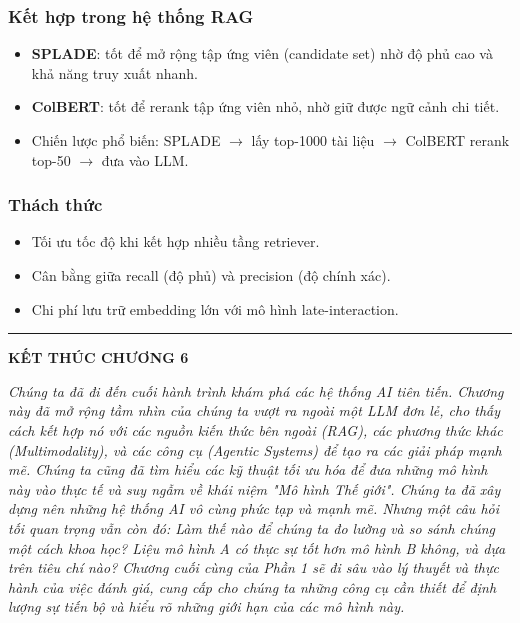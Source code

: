 \subsubsection*{Kết hợp trong hệ thống RAG}
\begin{itemize}
    \item \textbf{SPLADE}: tốt để mở rộng tập ứng viên (candidate set) nhờ độ phủ cao và khả năng truy xuất nhanh.
    \item \textbf{ColBERT}: tốt để rerank tập ứng viên nhỏ, nhờ giữ được ngữ cảnh chi tiết.
    \item Chiến lược phổ biến: SPLADE \(\rightarrow\) lấy top-1000 tài liệu \(\rightarrow\) ColBERT rerank top-50 \(\rightarrow\) đưa vào LLM.
\end{itemize}

\subsubsection*{Thách thức}
\begin{itemize}
    \item Tối ưu tốc độ khi kết hợp nhiều tầng retriever.
    \item Cân bằng giữa recall (độ phủ) và precision (độ chính xác).
    \item Chi phí lưu trữ embedding lớn với mô hình late-interaction.
\end{itemize}

\bigskip
\hrule
\bigskip

\begin{center}
    \textbf{\Large KẾT THÚC CHƯƠNG 6}
\end{center}

\textit{Chúng ta đã đi đến cuối hành trình khám phá các hệ thống AI tiên tiến. Chương này đã mở rộng tầm nhìn của chúng ta vượt ra ngoài một LLM đơn lẻ, cho thấy cách kết hợp nó với các nguồn kiến thức bên ngoài (RAG), các phương thức khác (Multimodality), và các công cụ (Agentic Systems) để tạo ra các giải pháp mạnh mẽ. Chúng ta cũng đã tìm hiểu các kỹ thuật tối ưu hóa để đưa những mô hình này vào thực tế và suy ngẫm về khái niệm "Mô hình Thế giới". Chúng ta đã xây dựng nên những hệ thống AI vô cùng phức tạp và mạnh mẽ. Nhưng một câu hỏi tối quan trọng vẫn còn đó: Làm thế nào để chúng ta đo lường và so sánh chúng một cách khoa học? Liệu mô hình A có thực sự tốt hơn mô hình B không, và dựa trên tiêu chí nào? Chương cuối cùng của Phần 1 sẽ đi sâu vào lý thuyết và thực hành của việc đánh giá, cung cấp cho chúng ta những công cụ cần thiết để định lượng sự tiến bộ và hiểu rõ những giới hạn của các mô hình này.}